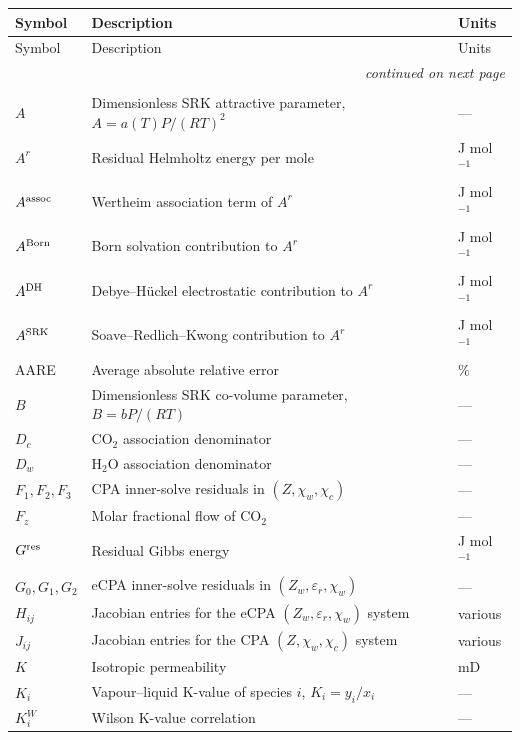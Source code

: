 \documentclass[preprint,12pt,authoryear]{elsarticle}
\begin{document}
\begin{longtable}{@{}p{}p{}p{}@{}}
  \toprule
  Symbol & Description & Units \\
  \midrule
  \endfirsthead
  \toprule
  Symbol & Description & Units \\
  \midrule
  \endhead
  \midrule
  \multicolumn{3}{r}{\textit{continued on next page}} \\
  \endfoot
  \bottomrule
  \endlastfoot
  \multicolumn{3}{l}{\textit{Upper case}} \\[2pt]
  $A$ & Dimensionless SRK attractive parameter, $A = a(T)P/(RT)^2$ & --- \\
  $A^r$ & Residual Helmholtz energy per mole & J mol$^{-1}$ \\
  $A^{\rm assoc}$ & Wertheim association term of $A^r$ & J mol$^{-1}$ \\
  $A^{\rm Born}$ & Born solvation contribution to $A^r$ & J mol$^{-1}$ \\
  $A^{\rm DH}$ & Debye--Hückel electrostatic contribution to $A^r$ & J mol$^{-1}$ \\
  $A^{\rm SRK}$ & Soave--Redlich--Kwong contribution to $A^r$ & J mol$^{-1}$ \\
  AARE & Average absolute relative error & \% \\
  $B$ & Dimensionless SRK co-volume parameter, $B = bP/(RT)$ & --- \\
  $D_c$ & CO$_2$ association denominator & --- \\
  $D_w$ & H$_2$O association denominator & --- \\
  $F_1, F_2, F_3$ & CPA inner-solve residuals in $(Z,\chi_w,\chi_c)$ & --- \\
  $F_z$ & Molar fractional flow of CO$_2$ & --- \\
  $G^{\rm res}$ & Residual Gibbs energy & J mol$^{-1}$ \\
  $G_0, G_1, G_2$ & eCPA inner-solve residuals in $(Z_w,\varepsilon_r,\chi_w)$ & --- \\
  $H_{ij}$ & Jacobian entries for the eCPA $(Z_w,\varepsilon_r,\chi_w)$ system & various \\
  $J_{ij}$ & Jacobian entries for the CPA $(Z,\chi_w,\chi_c)$ system & various \\
  $K$ & Isotropic permeability & mD \\
  $K_i$ & Vapour--liquid K-value of species $i$, $K_i = y_i/x_i$ & --- \\
  $K_i^W$ & Wilson K-value correlation & --- \\

\end{longtable}
\end{document}
